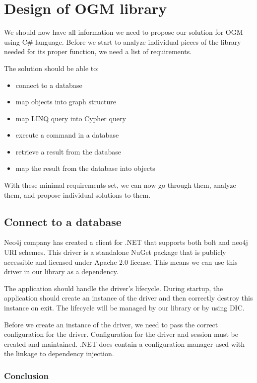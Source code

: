 \chapter {Design of OGM library}

We should now have all information we need to propose our solution for OGM using C\# language.
Before we start to analyze individual pieces of the library needed for its proper function, we need a list of requirements.

The solution should be able to:
\begin{itemize}
    \item {connect to a database}
    \item {map objects into graph structure}
    \item {map LINQ query into Cypher query}
    \item {execute a command in a database}
    \item {retrieve a result from the database}
    \item {map the result from the database into objects}
\end{itemize}

With these minimal requirements set, we can now go through them, analyze them, and propose individual solutions to them.

\section{Connect to a database}

Neo4j company has created a client for .NET that supports both bolt and neo4j URI schemes. \cite{noauthor_client_nodate} This driver is a standalone NuGet package that is publicly accessible and licensed under Apache 2.0 license. This means we can use this driver in our library as a dependency.

The application should handle the driver's lifecycle. During startup, the application should create an instance of the driver and then correctly destroy this instance on exit. The lifecycle will be managed by our library or by using DIC.

Before we create an instance of the driver, we need to pass the correct configuration for the driver. Configuration for the driver and session must be created and maintained. .NET does contain a configuration manager used with the linkage to dependency injection.

\subsection{Conclusion}

